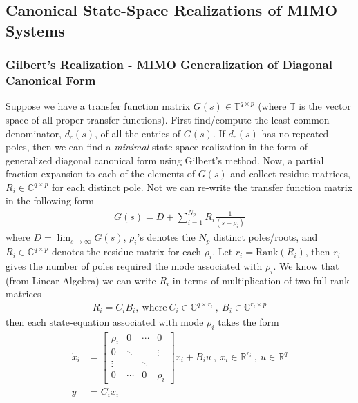 \documentclass[twoside]{article}
\begin{document}
\subsection{Canonical State-Space Realizations of MIMO Systems} 

\subsubsection{Gilbert's Realization - MIMO Generalization of Diagonal Canonical Form}

Suppose we have a transfer function matrix $G(s) \in \mathbb{T}^{q \times p}$ (where $\mathbb{T}$ is the vector space of all proper transfer functions).
First find/compute the least common denominator, $d_c(s)$,  of all the entries of $G(s)$. If $d_c(s)$ has no repeated 
poles, then we can find a \textit{minimal} state-space realization in the form of generalized diagonal canonical form 
using Gilbert's method. Now, a partial fraction expansion to each of the elements of  $G(s)$ and collect residue matrices, $R_i \in \mathbb{C}^{q \times p}$ for
each distinct pole. Not we can re-write the transfer function matrix in the following form
%
\begin{align*}
G(s) = D + \sum_{i=1}^{N_p} R_i \frac{1}{(s - \rho_i)} 
\end{align*}
%
where $D = \lim_{s \to \infty} G(s)$, $\rho_i$'s denotes the $N_p$ distinct poles/roots, and $R_i \in \mathbb{C}^{q \times p}$ denotes the residue matrix 
for each $\rho_i$. Let $r_i = \mathrm{Rank}(R_i)$, then $r_i$ gives the number of poles required the mode associated with $\rho_i$. We know that (from Linear Algebra) we can write $R_i$ in terms of multiplication of two full rank matrices
%
\begin{align*}
R_i = C_i  B_i , \ \mathrm{where} \ C_i \in \mathbb{C}^{q \times r_i} \ ,  \ B_i \in \mathbb{C}^{r_i \times p}  
\end{align*}
%
then each state-equation associated with mode $\rho_i$ takes the form
%
\begin{align*}
\dot{x}_i &= \left[ \begin{array}{cccc} \rho_i & 0 & \cdots & 0 \\  0 & \ddots & & \vdots \\  \vdots  & & \ddots & 
\\  0  & \cdots & 0 & \rho_i \end{array} \right] x_i
	+ B_i u \ , \ x_i \in \mathbb{R}^{r_i} \ , \ u \in \mathbb{R}^{q}
	\\
	y &= C_i x_i 
\end{align*}
\end{document}
